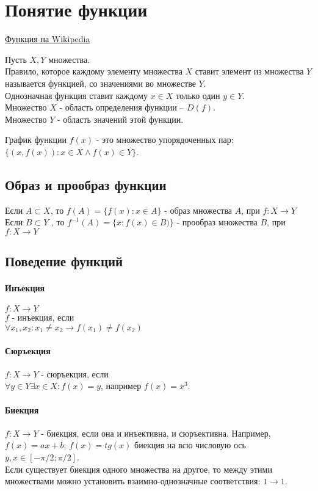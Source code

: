 \documentclass[10pt]{article}
\begin{document}
\section{Понятие функции}
	\href{http://en.wikipedia.org/wiki/Function_(mathematics)}{Функция на Wikipedia}
	
		Пусть $X, Y$ множества.\\
		Правило, которое каждому элементу множества $X$ ставит элемент из множества $Y$ называется функцией, со значениями
		во множестве $Y$.\\
		Однозначная функция ставит каждому $x \in X$ только один $y \in Y$.\\
		Множество $X$ - область определения функции -- $D(f)$.\\
		Множество $Y$ - область значений этой функции.
		
		График функции $f(x)$ - это множество упорядоченных пар:\\ $\{(x, f(x)) : x \in X \wedge f(x) \in Y\}$.
	\subsection{Образ и прообраз функции} 
		Если $A \subset X$, то $f(A) = \{f(x) : x \in A\}$ - образ множества $A$, при $f : X \to Y$\\
		Если $B \subset Y$ , то $f^{-1}(A) = \{x : f(x) \in B)\}$ - прообраз множества $B$, при $f : X \to Y$
	\subsection{Поведение функций}
		\paragraph{Инъекция}
			$f : X \to Y$\\
			$f$ - инъекция, если\\
			$\forall x_1, x_2 : x_1 \ne x_2 \to f(x_1) \ne f(x_2)$
		\paragraph{Сюръекция}
			$f : X \to Y$ - сюръекция, если\\
			$\forall y \in Y \exists x \in X : f(x) = y$, например $f(x) = x^3$.
		\paragraph{Биекция}
			$f : X \to Y$ - биекция, если она и инъективна, и сюръективна. Например, $f(x) = ax + b$; $f(x) = tg(x)$ биекция на всю
			числовую ось $y, x \in [-\pi/2; \pi/2]$.\\
			Если существует биекция одного множества на другое, то между этими множествами можно
			установить взаимно-однозначные соответствия: $1 \to 1$.
	
\end{document}
